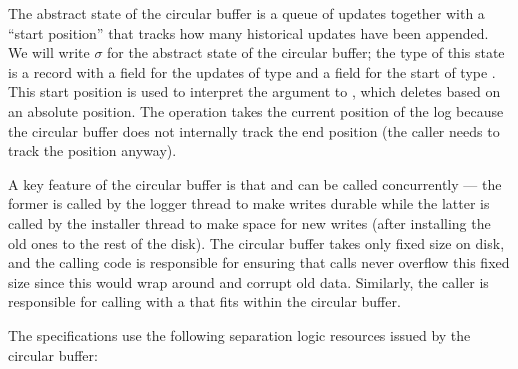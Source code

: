 The abstract state of the circular buffer is a queue of updates together with a
``start position'' that tracks how many historical updates have been appended.
We will write $\sigma$ for the abstract state of the circular buffer; the type
of this state is a record with a field for the updates of type  and a field for the start of type . This start position is
used to interpret the argument to , which deletes based on an
absolute position. The  operation takes the current  position
of the log because the circular buffer does not internally track the end
position (the caller needs to track the position anyway).

A key feature of the circular buffer is that  and  can
be called concurrently --- the former is called by the logger thread to make
writes durable while the latter is called by the installer thread to make space
for new writes (after installing the old ones to the rest of the disk). The
circular buffer takes only fixed size on disk, and the calling code is
responsible for ensuring that  calls never overflow this fixed size
since this would wrap around and corrupt old data. Similarly, the caller is
responsible for calling  with a  that fits within the
circular buffer.

The specifications use the following separation logic resources issued by the
circular buffer:


